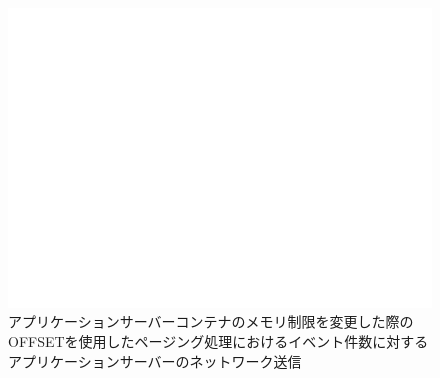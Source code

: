 \documentclass[../../../../../main]{subfiles}
\begin{document}
    \begin{figure}[H]
        \centering
        \includegraphics[width=12cm]{graph}
        \caption{アプリケーションサーバーコンテナのメモリ制限を変更した際のOFFSETを使用したページング処理におけるイベント件数に対するアプリケーションサーバーのネットワーク送信}
        \label{fig:paging-offset-change-app-memory-limit-app-net-out-app_4_db_1_1024}
    \end{figure}
\end{document}
